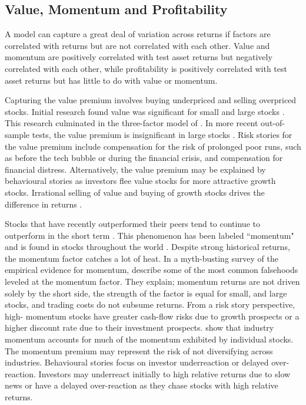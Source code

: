
\subsection{Value, Momentum and Profitability}

A model can capture a great deal of variation across returns if factors are correlated
with returns but are not correlated with each other. Value and momentum are positively
correlated with test asset returns but negatively correlated with each other, while
profitability is positively correlated with test asset returns but has little to do with
value or momentum.

Capturing the value premium involves buying underpriced and selling overpriced stocks.
Initial research found value was significant for small and large stocks
\parencite{fama1992cross}. This research culminated in the three-factor model of
\textcite{fama1993common}. In more recent out-of-sample tests, the value premium is
insignificant in large stocks \parencite{asness2015fact}. Risk stories for the value
premium include compensation for the risk of prolonged poor runs, such as before the tech
bubble or during the financial crisis, and compensation for financial distress.
Alternatively, the value premium may be explained by behavioural stories as investors flee
value stocks for more attractive growth stocks. Irrational selling of value and buying of
growth stocks drives the difference in returns \parencite{bondt1985does}.

Stocks that have recently outperformed their peers tend to continue to outperform in the
short term \parencite{jegadeesh1993returns}. This phenomenon has been labeled ``momentum"
and is found in stocks throughout the world \parencite{asness2013value}. Despite strong
historical returns, the momentum factor catches a lot of heat. In a myth-busting survey of
the empirical evidence for momentum, \textcite{asness2014fact} describe some of the most
common falsehoods leveled at the momentum factor. They explain; momentum returns are not
driven solely by the short side, the strength of the factor is equal for small, and large
stocks, and trading costs do not subsume returns. From a risk story perspective, high-
momentum stocks have greater cash-flow risks due to growth prospects or a higher discount
rate due to their investment prospects. \textcite{moskowitz1999industries} show that
industry momentum accounts for much of the momentum exhibited by individual stocks. The
momentum premium may represent the risk of not diversifying across industries. Behavioural
stories focus on investor underreaction or delayed over-reaction. Investors may underreact
initially to high relative returns due to slow news or have a delayed over-reaction as
they chase stocks with high relative returns.

